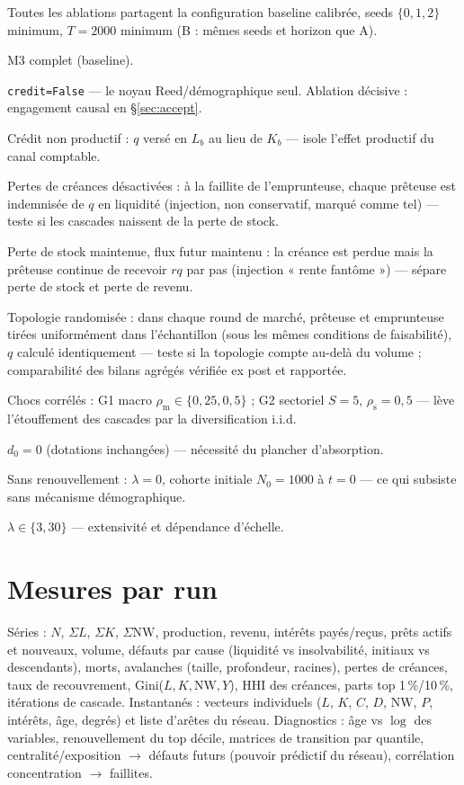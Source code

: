 \documentclass[11pt,a4paper]{article}
\newcommand{\NW}{\mathrm{NW}}
\newcommand{\code}[1]{\texttt{#1}}
\begin{document}
Toutes les ablations partagent la configuration baseline calibrée, seeds
$\{0, 1, 2\}$ minimum, $T = 2000$ minimum (B : mêmes seeds et horizon que A).
\begin{description}[leftmargin=1.8em, itemsep=2pt]
\item[A.] M3 complet (baseline).
\item[B.] \code{credit=False} --- le noyau Reed/démographique seul. Ablation
  décisive : engagement causal en §\ref{sec:accept}.
\item[C.] Crédit non productif : $q$ versé en $L_b$ au lieu de $K_b$ ---
  isole l'effet productif du canal comptable.
\item[D.] Pertes de créances désactivées : à la faillite de l'emprunteuse,
  chaque prêteuse est indemnisée de $q$ en liquidité (injection, non
  conservatif, marqué comme tel) --- teste si les cascades naissent de la
  perte de stock.
\item[E.] Perte de stock maintenue, flux futur maintenu : la créance est
  perdue mais la prêteuse continue de recevoir $rq$ par pas (injection
  « rente fantôme ») --- sépare perte de stock et perte de revenu.
\item[F.] Topologie randomisée : dans chaque round de marché, prêteuse et
  emprunteuse tirées uniformément dans l'échantillon (sous les mêmes
  conditions de faisabilité), $q$ calculé identiquement --- teste si la
  topologie compte au-delà du volume ; comparabilité des bilans agrégés
  vérifiée ex post et rapportée.
\item[G.] Chocs corrélés : G1 macro $\rho_{\mathrm{m}} \in \{0{,}25, 0{,}5\}$ ;
  G2 sectoriel $S = 5$, $\rho_{\mathrm{s}} = 0{,}5$ --- lève l'étouffement
  des cascades par la diversification i.i.d.
\item[H.] $d_0 = 0$ (dotations inchangées) --- nécessité du plancher
  d'absorption.
\item[I.] Sans renouvellement : $\lambda = 0$, cohorte initiale
  $N_0 = 1000$ à $t = 0$ --- ce qui subsiste sans mécanisme démographique.
\item[J.] $\lambda \in \{3, 30\}$ --- extensivité et dépendance d'échelle.
\end{description}

\section{Mesures par run}

Séries : $N$, $\Sigma L$, $\Sigma K$, $\Sigma \NW$, production, revenu,
intérêts payés/reçus, prêts actifs et nouveaux, volume, défauts par cause
(liquidité vs insolvabilité, initiaux vs descendants), morts, avalanches
(taille, profondeur, racines), pertes de créances, taux de recouvrement,
Gini($L, K, \NW, Y$), HHI des créances, parts top 1\,\%/10\,\%,
itérations de cascade. Instantanés : vecteurs individuels ($L$, $K$, $C$,
$D$, $\NW$, $P$, intérêts, âge, degrés) et liste d'arêtes du réseau.
Diagnostics : âge vs $\log$ des variables, renouvellement du top décile,
matrices de transition par quantile, centralité/exposition $\to$ défauts
futurs (pouvoir prédictif du réseau), corrélation
concentration $\to$ faillites.
\end{document}
